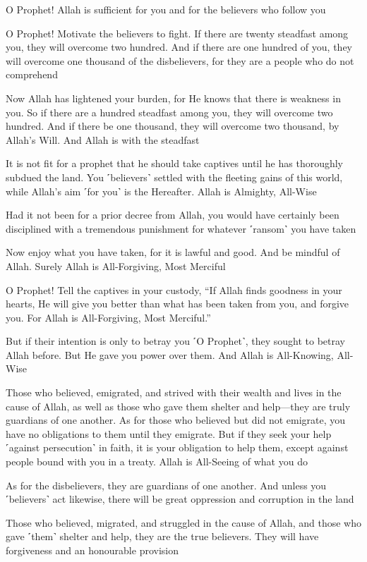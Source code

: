 O Prophet! Allah is sufficient for you and for the believers who follow you

O Prophet! Motivate the believers to fight. If there are twenty steadfast among you, they will overcome two hundred. And if there are one hundred of you, they will overcome one thousand of the disbelievers, for they are a people who do not comprehend

Now Allah has lightened your burden, for He knows that there is weakness in you. So if there are a hundred steadfast among you, they will overcome two hundred. And if there be one thousand, they will overcome two thousand, by Allah’s Will. And Allah is with the steadfast

It is not fit for a prophet that he should take captives until he has thoroughly subdued the land. You ˹believers˺ settled with the fleeting gains of this world, while Allah’s aim ˹for you˺ is the Hereafter. Allah is Almighty, All-Wise

Had it not been for a prior decree from Allah, you would have certainly been disciplined with a tremendous punishment for whatever ˹ransom˺ you have taken

Now enjoy what you have taken, for it is lawful and good. And be mindful of Allah. Surely Allah is All-Forgiving, Most Merciful

O Prophet! Tell the captives in your custody, “If Allah finds goodness in your hearts, He will give you better than what has been taken from you, and forgive you. For Allah is All-Forgiving, Most Merciful.”

But if their intention is only to betray you ˹O Prophet˺, they sought to betray Allah before. But He gave you power over them. And Allah is All-Knowing, All-Wise

Those who believed, emigrated, and strived with their wealth and lives in the cause of Allah, as well as those who gave them shelter and help—they are truly guardians of one another. As for those who believed but did not emigrate, you have no obligations to them until they emigrate. But if they seek your help ˹against persecution˺ in faith, it is your obligation to help them, except against people bound with you in a treaty. Allah is All-Seeing of what you do

As for the disbelievers, they are guardians of one another. And unless you ˹believers˺ act likewise, there will be great oppression and corruption in the land

Those who believed, migrated, and struggled in the cause of Allah, and those who gave ˹them˺ shelter and help, they are the true believers. They will have forgiveness and an honourable provision

